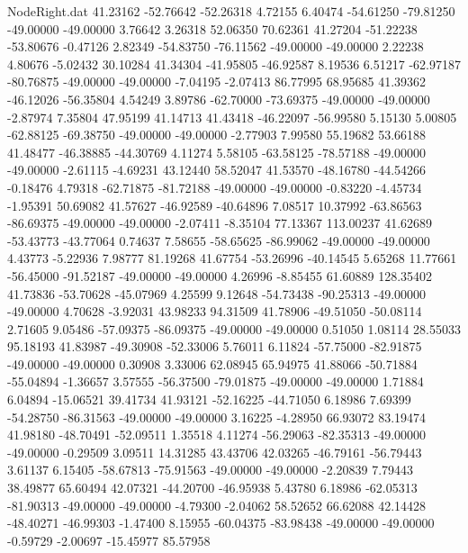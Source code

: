 \begin{filecontents}{NodeRight.dat}
  41.23162  -52.76642  -52.26318     4.72155    6.40474  -54.61250  -79.81250  -49.00000  -49.00000    3.76642    3.26318   52.06350   70.62361
  41.27204  -51.22238  -53.80676    -0.47126    2.82349  -54.83750  -76.11562  -49.00000  -49.00000    2.22238    4.80676   -5.02432   30.10284
  41.34304  -41.95805  -46.92587     8.19536    6.51217  -62.97187  -80.76875  -49.00000  -49.00000   -7.04195   -2.07413   86.77995   68.95685
  41.39362  -46.12026  -56.35804     4.54249    3.89786  -62.70000  -73.69375  -49.00000  -49.00000   -2.87974    7.35804   47.95199   41.14713
  41.43418  -46.22097  -56.99580     5.15130    5.00805  -62.88125  -69.38750  -49.00000  -49.00000   -2.77903    7.99580   55.19682   53.66188
  41.48477  -46.38885  -44.30769     4.11274    5.58105  -63.58125  -78.57188  -49.00000  -49.00000   -2.61115   -4.69231   43.12440   58.52047
  41.53570  -48.16780  -44.54266    -0.18476    4.79318  -62.71875  -81.72188  -49.00000  -49.00000   -0.83220   -4.45734   -1.95391   50.69082
  41.57627  -46.92589  -40.64896     7.08517   10.37992  -63.86563  -86.69375  -49.00000  -49.00000   -2.07411   -8.35104   77.13367  113.00237
  41.62689  -53.43773  -43.77064     0.74637    7.58655  -58.65625  -86.99062  -49.00000  -49.00000    4.43773   -5.22936    7.98777   81.19268
  41.67754  -53.26996  -40.14545     5.65268   11.77661  -56.45000  -91.52187  -49.00000  -49.00000    4.26996   -8.85455   61.60889  128.35402
  41.73836  -53.70628  -45.07969     4.25599    9.12648  -54.73438  -90.25313  -49.00000  -49.00000    4.70628   -3.92031   43.98233   94.31509
  41.78906  -49.51050  -50.08114     2.71605    9.05486  -57.09375  -86.09375  -49.00000  -49.00000    0.51050    1.08114   28.55033   95.18193
  41.83987  -49.30908  -52.33006     5.76011    6.11824  -57.75000  -82.91875  -49.00000  -49.00000    0.30908    3.33006   62.08945   65.94975
  41.88066  -50.71884  -55.04894    -1.36657    3.57555  -56.37500  -79.01875  -49.00000  -49.00000    1.71884    6.04894  -15.06521   39.41734
  41.93121  -52.16225  -44.71050     6.18986    7.69399  -54.28750  -86.31563  -49.00000  -49.00000    3.16225   -4.28950   66.93072   83.19474
  41.98180  -48.70491  -52.09511     1.35518    4.11274  -56.29063  -82.35313  -49.00000  -49.00000   -0.29509    3.09511   14.31285   43.43706
  42.03265  -46.79161  -56.79443     3.61137    6.15405  -58.67813  -75.91563  -49.00000  -49.00000   -2.20839    7.79443   38.49877   65.60494
  42.07321  -44.20700  -46.95938     5.43780    6.18986  -62.05313  -81.90313  -49.00000  -49.00000   -4.79300   -2.04062   58.52652   66.62088
  42.14428  -48.40271  -46.99303    -1.47400    8.15955  -60.04375  -83.98438  -49.00000  -49.00000   -0.59729   -2.00697  -15.45977   85.57958

\end{filecontents}
